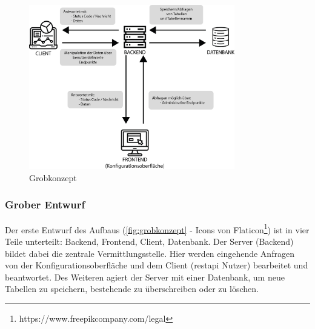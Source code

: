 \begin{figure}[h]
    \centering
    \includegraphics[width=0.8\textwidth]{figures/grobkonzept.png}
    \caption{Grobkonzept}
    \label{fig:grobkonzept}
\end{figure}

\subsubsection{Grober Entwurf}
Der erste Entwurf des Aufbaus (\autoref{fig:grobkonzept} - Icons von Flaticon\footnote{https://www.freepikcompany.com/legal}) ist in vier Teile unterteilt: Backend, Frontend, Client, Datenbank. Der Server (Backend) bildet dabei die zentrale Vermittlungsstelle. Hier werden eingehende Anfragen von der Konfigurationsoberfläche und dem Client (\gls{restapi} Nutzer) bearbeitet und beantwortet. Des Weiteren agiert der Server mit einer Datenbank, um neue Tabellen zu speichern, bestehende zu überschreiben oder zu löschen. 


